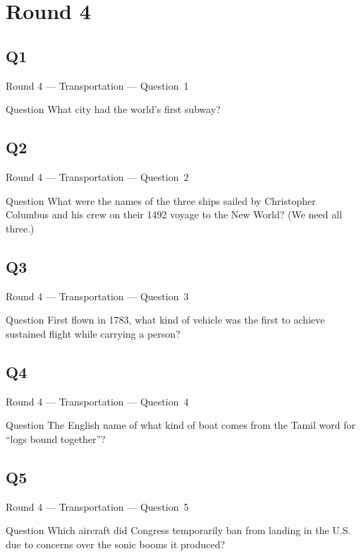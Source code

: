 \documentclass[11pt]{beamer}
\begin{document}
\section{Round 4}
\subsection*{Q1}
\begin{frame}[t]{Round 4 --- Transportation --- \mbox{Question 1}}
\vspace{-0.5em}
\begin{block}{Question}
What city had the world's first subway?  
\end{block}
\end{frame}
\subsection*{Q2}
\begin{frame}[t]{Round 4 --- Transportation --- \mbox{Question 2}}
\vspace{-0.5em}
\begin{block}{Question}
What were the names of the three ships sailed by Christopher Columbus and his crew on their 1492 voyage to the New World? (We need all three.)
\end{block}
\end{frame}
\subsection*{Q3}
\begin{frame}[t]{Round 4 --- Transportation --- \mbox{Question 3}}
\vspace{-0.5em}
\begin{block}{Question}
First flown in 1783, what kind of vehicle was the first to achieve sustained flight while carrying a person?
\end{block}
\end{frame}
\subsection*{Q4}
\begin{frame}[t]{Round 4 --- Transportation --- \mbox{Question 4}}
\vspace{-0.5em}
\begin{block}{Question}
The English name of what kind of boat comes from the Tamil word for ``logs bound together''?
\end{block}
\end{frame}
\subsection*{Q5}
\begin{frame}[t]{Round 4 --- Transportation --- \mbox{Question 5}}
\vspace{-0.5em}
\begin{block}{Question}
Which aircraft did Congress temporarily ban from landing in the U.S. due to concerns over the sonic booms it produced?
\end{block}
\end{frame}
\end{document}
